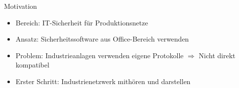 \begin{frame}{Motivation}
    \begin{itemize}[<+->]
      \item Bereich: IT-Sicherheit für Produktionsnetze
      \item Ansatz: Sicherheitssoftware aus Office-Bereich verwenden
      \item Problem: Industrieanlagen verwenden eigene Protokolle
            \newline $\Rightarrow$ Nicht direkt kompatibel
      \item Erster Schritt: Industrienetzwerk mithören und darstellen
    \end{itemize}
\end{frame} 